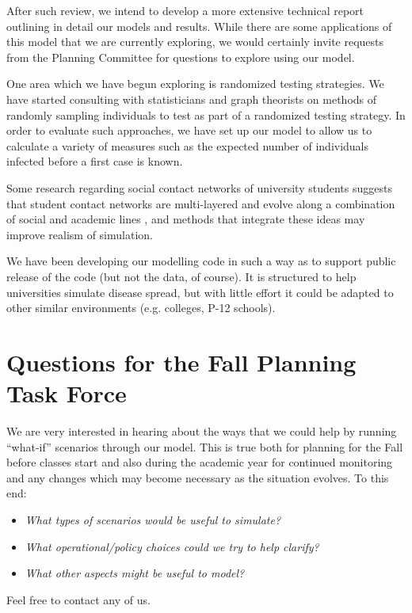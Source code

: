 \documentclass[fleqn,10pt]{SelfArx} %
\begin{document}
After such review, we intend to develop a more extensive technical report outlining in detail our models and results.  While there are some applications of this model that we are currently exploring, we would certainly invite requests from the Planning Committee for questions to explore using our model. 

One area which we have begun exploring is randomized testing strategies.  We have started consulting with statisticians and graph theorists on methods of randomly sampling individuals to test as part of a randomized testing strategy.  In order to evaluate such approaches, we have set up our model to allow us to calculate a variety of measures such as the expected number of individuals infected before a first case is known.

Some research regarding social contact networks of university students suggests that student contact networks are multi-layered and evolve along a combination of social and academic lines \cite{stadtfeld_integration_2019}, and methods that integrate these ideas may improve realism of simulation.

We have been developing our modelling code in such a way as to support public release of the code (but not the data, of course).  
It is structured to help universities simulate disease spread, but with little effort it could be adapted to other similar environments (e.g. colleges, P-12 schools).


\section{Questions for the Fall Planning Task Force}

We are very interested in hearing about the ways that we could help by running ``what-if'' scenarios through our model.
This is true both for planning for the Fall before classes start and also  during the academic year for continued monitoring and any changes which may become necessary as the situation evolves.
To this end:
\begin{itemize}

 \item \emph{ What types of scenarios would be useful to simulate?}

 \item \emph{What operational/policy choices could we try to help clarify?}

 \item \emph{What other aspects might be useful to model?}

\end{itemize}
Feel free to contact any of us.
\end{document}
